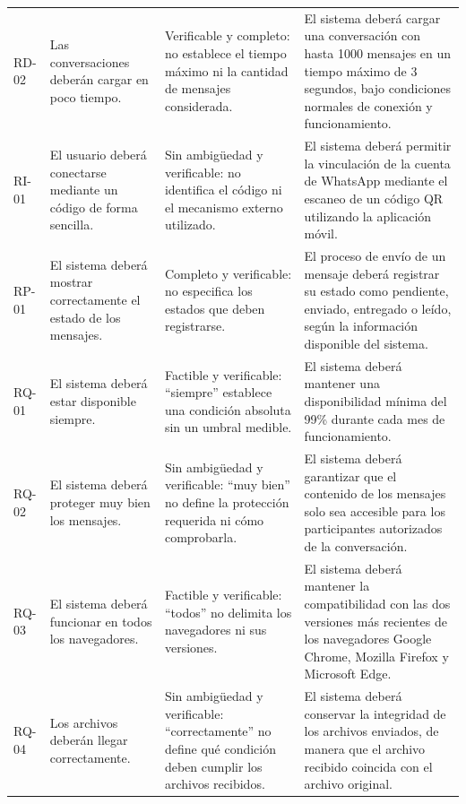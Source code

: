 \documentclass[12pt,a4paper,oneside]{article}
\begin{document}
\begin{longtable}{C{1.3cm} L{4.0cm} L{3.6cm} L{4.2cm}}
RD-02 &
Las conversaciones deberán cargar en poco tiempo. &
Verificable y completo: no establece el tiempo máximo ni la cantidad de mensajes considerada. &
El sistema deberá cargar una conversación con hasta 1000 mensajes en un tiempo máximo de 3 segundos, bajo condiciones normales de conexión y funcionamiento. \\

RI-01 &
El usuario deberá conectarse mediante un código de forma sencilla. &
Sin ambigüedad y verificable: no identifica el código ni el mecanismo externo utilizado. &
El sistema deberá permitir la vinculación de la cuenta de WhatsApp mediante el escaneo de un código QR utilizando la aplicación móvil. \\

RP-01 &
El sistema deberá mostrar correctamente el estado de los mensajes. &
Completo y verificable: no especifica los estados que deben registrarse. &
El proceso de envío de un mensaje deberá registrar su estado como pendiente, enviado, entregado o leído, según la información disponible del sistema. \\

RQ-01 &
El sistema deberá estar disponible siempre. &
Factible y verificable: ``siempre'' establece una condición absoluta sin un umbral medible. &
El sistema deberá mantener una disponibilidad mínima del 99\% durante cada mes de funcionamiento. \\

RQ-02 &
El sistema deberá proteger muy bien los mensajes. &
Sin ambigüedad y verificable: ``muy bien'' no define la protección requerida ni cómo comprobarla. &
El sistema deberá garantizar que el contenido de los mensajes solo sea accesible para los participantes autorizados de la conversación. \\

RQ-03 &
El sistema deberá funcionar en todos los navegadores. &
Factible y verificable: ``todos'' no delimita los navegadores ni sus versiones. &
El sistema deberá mantener la compatibilidad con las dos versiones más recientes de los navegadores Google Chrome, Mozilla Firefox y Microsoft Edge. \\

RQ-04 &
Los archivos deberán llegar correctamente. &
Sin ambigüedad y verificable: ``correctamente'' no define qué condición deben cumplir los archivos recibidos. &
El sistema deberá conservar la integridad de los archivos enviados, de manera que el archivo recibido coincida con el archivo original. \\


\end{longtable}
\end{document}
